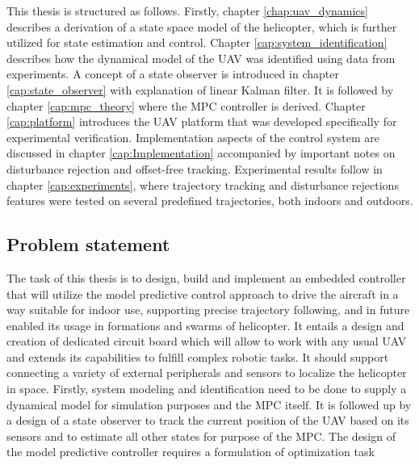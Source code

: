 This thesis is structured as follows. Firstly, chapter \ref{chap:uav_dynamics} describes a derivation of a state space model of the helicopter, which is further utilized for state estimation and control. Chapter \ref{cap:system_identification} describes how the dynamical model of the UAV was identified using data from experiments. A concept of a state observer is introduced in chapter \ref{cap:state_observer} with explanation of linear Kalman filter. It is followed by chapter \ref{cap:mpc_theory} where the MPC controller is derived. Chapter \ref{cap:platform} introduces the UAV platform that was developed specifically for experimental verification. Implementation aspects of the control system are discussed in chapter \ref{cap:Implementation} accompanied by important notes on disturbance rejection and offset-free tracking. Experimental results follow in chapter \ref{cap:experiments}, where trajectory tracking and disturbance rejections features were tested on several predefined trajectories, both indoors and outdoors.

\subsection{Problem statement}

The task of this thesis is to design, build and implement an embedded controller that will utilize the model predictive control approach to drive the aircraft in a way suitable for indoor use, supporting precise trajectory following, and in future enabled its usage in formations and swarms of helicopter. It entails a design and creation of dedicated circuit board which will allow to work with any usual UAV and extends its capabilities to fulfill complex robotic tasks. It should support connecting a variety of external peripherals and sensors to localize the helicopter in space. Firstly, system modeling and identification need to be done to supply a dynamical model for simulation purposes and the MPC itself. It is followed up by a design of a state observer to track the current position of the UAV based on its sensors and to estimate all other states for purpose of the MPC. The design of the model predictive controller requires a formulation of optimization task

